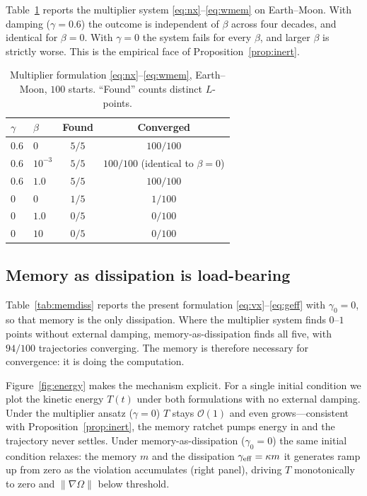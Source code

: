 \documentclass[10pt,twocolumn]{article}
\begin{document}
Table~\ref{tab:inert} reports the multiplier system
\eqref{eq:nx}--\eqref{eq:wmem} on Earth--Moon. With damping ($\gamma=0.6$) the
outcome is independent of $\beta$ across four decades, and identical for
$\beta=0$. With $\gamma=0$ the system fails for every $\beta$, and larger
$\beta$ is strictly worse. This is the empirical face of
Proposition~\ref{prop:inert}.

\begin{table}[ht]
\centering
\caption{Multiplier formulation \eqref{eq:nx}--\eqref{eq:wmem},
Earth--Moon, $100$ starts. ``Found'' counts distinct $L$-points.}
\label{tab:inert}
\small
\begin{tabular}{llcc}
\toprule
$\gamma$ & $\beta$ & Found & Converged\\
\midrule
$0.6$ & $0$       & $5/5$ & $100/100$\\
$0.6$ & $10^{-3}$ & $5/5$ & $100/100$ \;(identical to $\beta=0$)\\
$0.6$ & $1.0$     & $5/5$ & $100/100$\\
$0$   & $0$       & $1/5$ & $1/100$\\
$0$   & $1.0$     & $0/5$ & $0/100$\\
$0$   & $10$      & $0/5$ & $0/100$\\
\bottomrule
\end{tabular}
\end{table}

\subsection{Memory as dissipation is load-bearing}

Table~\ref{tab:memdiss} reports the present formulation
\eqref{eq:vx}--\eqref{eq:geff} with $\gamma_0=0$, so that memory is the only
dissipation. Where the multiplier system finds $0$--$1$ points without external
damping, memory-as-dissipation finds all five, with $94/100$ trajectories
converging. The memory is therefore necessary for convergence: it is doing the
computation.

Figure~\ref{fig:energy} makes the mechanism explicit. For a single initial
condition we plot the kinetic energy $T(t)$ under both formulations with no
external damping. Under the multiplier ansatz ($\gamma=0$) $T$ stays
$\mathcal O(1)$ and even grows---consistent with Proposition~\ref{prop:inert},
the memory ratchet pumps energy in and the trajectory never settles. Under
memory-as-dissipation ($\gamma_0=0$) the same initial condition relaxes: the
memory $m$ and the dissipation $\gamma_{\rm eff}=\kappa m$ it generates ramp up
from zero as the violation accumulates (right panel), driving $T$ monotonically
to zero and $\lVert\nabla\Omega\rVert$ below threshold.
\end{document}
